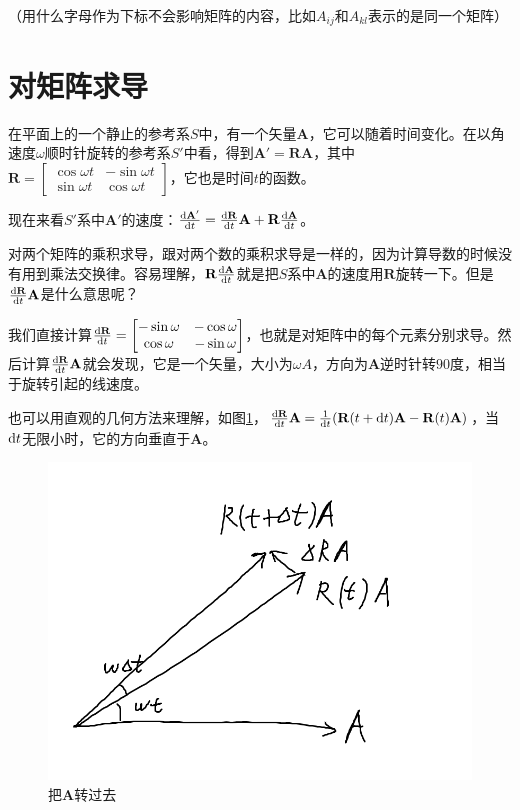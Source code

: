 （用什么字母作为下标不会影响矩阵的内容，比如$A_{i j}$和$A_{k l}$表示的是同一个矩阵）
\section{对矩阵求导}
在平面上的一个静止的参考系$S$中，有一个矢量$\mathbf{A}$，它可以随着时间变化。在以角速度$\omega$顺时针旋转的参考系$S'$中看，得到$\mathbf{A'}=\mathbf{R} \mathbf{A}$，其中$\mathbf{R}=\begin{bmatrix}
\cos \omega t & -\sin \omega t \\
\sin \omega t & \cos \omega t
\end{bmatrix}$，它也是时间$t$的函数。

现在来看$S'$系中$\mathbf{A'}$的速度：$\frac{\mathop{}\!\mathrm{d} \mathbf{A'}}{\mathop{}\!\mathrm{d} t}=\frac{\mathop{}\!\mathrm{d} \mathbf{R}}{\mathop{}\!\mathrm{d} t} \mathbf{A}+\mathbf{R} \frac{\mathop{}\!\mathrm{d} \mathbf{A}}{\mathop{}\!\mathrm{d} t}$。

对两个矩阵的乘积求导，跟对两个数的乘积求导是一样的，因为计算导数的时候没有用到乘法交换律。容易理解，$\mathbf{R} \frac{\mathop{}\!\mathrm{d} \mathbf{A}}{\mathop{}\!\mathrm{d} t}$就是把$S$系中$\mathbf{A}$的速度用$\mathbf{R}$旋转一下。但是$\frac{\mathop{}\!\mathrm{d} \mathbf{R}}{\mathop{}\!\mathrm{d} t} \mathbf{A}$是什么意思呢？

我们直接计算$\frac{\mathop{}\!\mathrm{d} \mathbf{R}}{\mathop{}\!\mathrm{d} t}=\begin{bmatrix}
-\sin \omega & -\cos \omega \\
\cos \omega & -\sin \omega
\end{bmatrix}$，也就是对矩阵中的每个元素分别求导。然后计算$\frac{\mathop{}\!\mathrm{d} \mathbf{R}}{\mathop{}\!\mathrm{d} t} \mathbf{A}$就会发现，它是一个矢量，大小为$\omega A$，方向为$\mathbf{A}$逆时针转$90$度，相当于旋转引起的线速度。

也可以用直观的几何方法来理解，如图\ref{fig-rotate-deri}，$\frac{\mathop{}\!\mathrm{d} \mathbf{R}}{\mathop{}\!\mathrm{d} t} \mathbf{A}=\frac{1}{\mathop{}\!\mathrm{d} t}(\mathbf{R}(t+\mathop{}\!\mathrm{d} t) \mathbf{A}-\mathbf{R}(t) \mathbf{A})$，当$\mathop{}\!\mathrm{d} t$无限小时，它的方向垂直于$\mathbf{A}$。
\begin{figure}[htb]
\centering
\includegraphics[scale=0.5]{fig/rotate-deri.png}
\caption{把$\mathbf{A}$转过去}
\label{fig-rotate-deri}
\end{figure}

